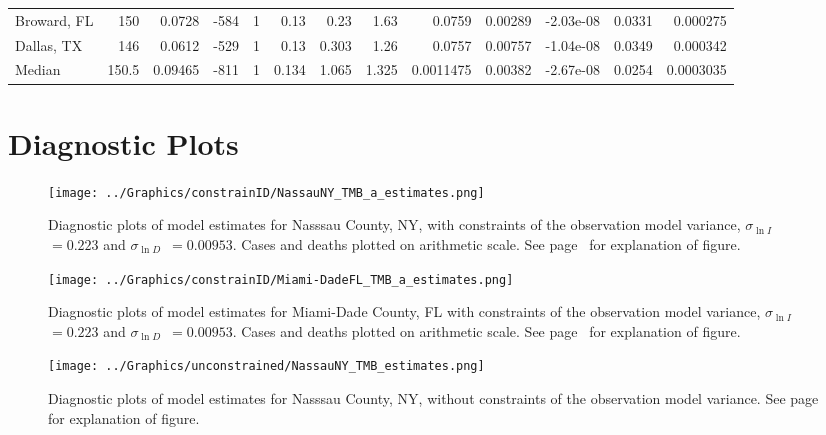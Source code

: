 \documentclass[12pt,letterpaper]{article}
\newcommand\slI{$\sigma_{\ln I}$\ }
\newcommand\slD{$\sigma_{\ln D}$}
\begin{document}
\begin{appendices}
\begin{sidewaystable}
{\begin{tabular}{lrrrrrrrrrrrr}
 Broward, FL        & 150   & 0.0728  &  -584 &     1 &           0.13  &            0.23  &          1.63  &    0.0759    &     0.00289  &        -2.03e-08 &           0.0331  &       0.000275  \\
 Dallas, TX         & 146   & 0.0612  &  -529 &     1 &           0.13  &            0.303 &          1.26  &    0.0757    &     0.00757  &        -1.04e-08 &           0.0349  &       0.000342  \\
 Median             & 150.5 & 0.09465 &  -811 &     1 &           0.134 &            1.065 &          1.325 &    0.0011475 &     0.00382  &        -2.67e-08 &           0.0254  &       0.0003035 \\
\hline
\end{tabular}

}\end{sidewaystable}



\clearpage
\section{Diagnostic Plots}

\begin{figure}[h!]
\begin{center}
\texttt{[image: ../Graphics/constrainID/NassauNY\_TMB\_a\_estimates.png]}
\end{center}
\caption{\label{fig:estsNaNYca}
Diagnostic plots of model estimates for Nasssau County, NY, 
with constraints of the observation model variance, 
\slI~$ = 0.223$ and \slD~$= 0.00953$. 
Cases and deaths plotted on arithmetic scale.
See page~\pageref{pp:diagexpl} for explanation of figure.
}
\end{figure}
\clearpage

\begin{figure}
\begin{center}
\texttt{[image: ../Graphics/constrainID/Miami-DadeFL\_TMB\_a\_estimates.png]}
\end{center}
\caption{\label{fig:estsMDFLca}
Diagnostic plots of model estimates for Miami-Dade County, FL
with constraints of the observation model variance, 
\slI~$ = 0.223$ and \slD~$= 0.00953$. 
Cases and deaths plotted on arithmetic scale.
See page~\pageref{pp:diagexpl} for explanation of figure.
}
\end{figure}

\begin{figure}[h!]
\begin{center}
\texttt{[image: ../Graphics/unconstrained/NassauNY\_TMB\_estimates.png]}
\end{center}
\caption{\label{fig:estsNaNYu}
Diagnostic plots of model estimates for Nasssau County, NY, 
without constraints of the observation model variance. 
See page~\pageref{pp:diagexpl} for explanation of figure.
}
\end{figure}
\clearpage


\end{appendices}
\end{document}

